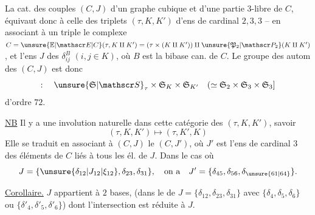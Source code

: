 La cat. des couples $(C,J)$ d'un graphe cubique et d'une partie $3$-libre de $C$, équivaut donc à celle des triplets $(\tau,K,K')$ d'ens  de cardinal $2,3,3$ -- en associant à un triple le complexe $C=\unsure{\mathbb E|\mathscr E|C}(\tau,K\amalg K')=(\tau\times(K\amalg K'))\amalg\unsure{\mathfrak P_2|\mathscr P_2}(K\amalg K')$, et l'ens $J$ des $\delta^B_{ij}$ $(i,j\in K)$, où $B$ est la bibase can. de $C$. Le groupe
des autom des $(C,J)$ est donc 
\[
:\quad \unsure{\mathfrak S|\mathscr S}_\tau\times\mathfrak S_K\times\mathfrak S_{K'}\quad(\simeq\mathfrak S_2\times\mathfrak S_3\times\mathfrak S_3]
\]
d'ordre $72$.

\uline{NB} Il y a une involution naturelle dans cette catégorie des $(\tau,K,K')$, savoir
\[
(\tau,K,K')\longmapsto(\tau,K',K)
\]
Elle se traduit en associant à $(C,J)$ le $(C,J')$, où $J'$ est l'ens de cardinal $3$ des éléments de $C$ liés à tous les él. de $J$. Dans le cas où
\[
J=\{\unsure{\delta_{12}|J_{12}|\xi_{12}},\delta_{23},\delta_{31}\},\quad\text{on a}\quad J'=\{\delta_{45},\delta_{56},\delta_{\unsure{61|64}}\}.
\]

\uline{Corollaire.} $J$ appartient à  $2$ bases,   (dans  le  de $J=\{\delta_{12},\delta_{23},\delta_{31}\}$ avec $\{\delta_4,\delta_5,\delta_6\}$ ou $\{\delta'_4,\delta'_5,\delta'_6\}$) dont l'intersection est réduite à $J$. 

